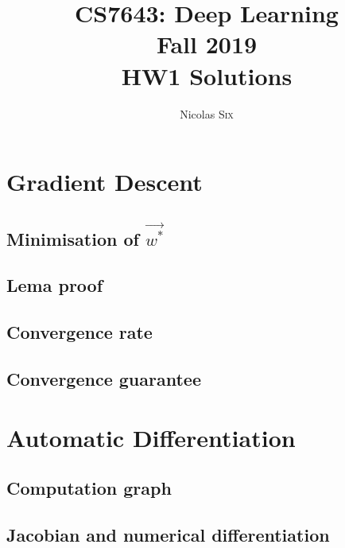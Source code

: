 \documentclass[11pt,english]{article}
\begin{document}
\title{CS7643: Deep Learning \\
Fall 2019\\ HW1 Solutions}
\author{Nicolas \textsc{Six}}
\maketitle



    \section{Gradient Descent}
    \subsection{Minimisation of $\vec{w^*}$}
    

\pagebreak

    \subsection{Lema proof}
    

\pagebreak

    \subsection{Convergence rate}
    

\pagebreak

    \subsection{Convergence guarantee}
    

\pagebreak

    \section{Automatic Differentiation}
    \subsection{Computation graph}
    

\pagebreak

    \subsection{Jacobian and numerical differentiation}
    
\end{document}
